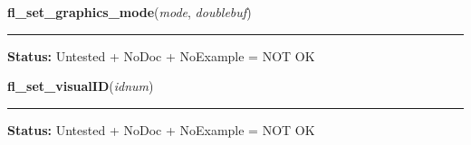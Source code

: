     \label{xformslib:library:fl_set_graphics_mode}

    \vspace{0.5ex}

\hspace{.8\funcindent}\begin{boxedminipage}{\funcwidth}

    \raggedright \textbf{fl\_set\_graphics\_mode}(\textit{mode}, \textit{doublebuf})

    \vspace{-1.5ex}

    \rule{\textwidth}{0.5\fboxrule}
\setlength{\parskip}{2ex}
\setlength{\parskip}{1ex}
\textbf{Status:} Untested + NoDoc + NoExample = NOT OK



    \end{boxedminipage}

    \label{xformslib:library:fl_set_visualID}

    \vspace{0.5ex}

\hspace{.8\funcindent}\begin{boxedminipage}{\funcwidth}

    \raggedright \textbf{fl\_set\_visualID}(\textit{idnum})

    \vspace{-1.5ex}

    \rule{\textwidth}{0.5\fboxrule}
\setlength{\parskip}{2ex}
\setlength{\parskip}{1ex}
\textbf{Status:} Untested + NoDoc + NoExample = NOT OK



    \end{boxedminipage}

    \label{xformslib:library:fl_keysym_pressed}

    \vspace{0.5ex}

